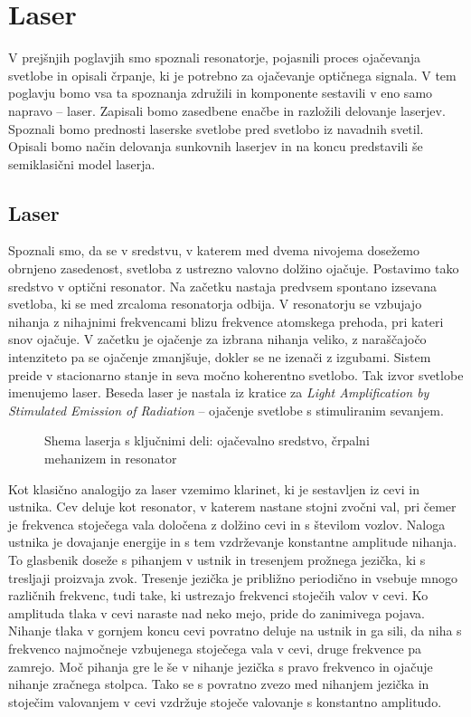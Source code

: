 \chapter{Laser}

V prejšnjih poglavjih smo spoznali resonatorje, pojasnili proces ojačevanja svetlobe in 
opisali črpanje, ki je potrebno za ojačevanje optičnega signala. V tem poglavju bomo vsa ta
spoznanja združili in komponente sestavili v eno samo napravo -- laser. Zapisali
bomo zasedbene enačbe in razložili delovanje laserjev. Spoznali bomo prednosti 
laserske svetlobe pred svetlobo iz navadnih svetil. Opisali bomo način delovanja 
sunkovnih laserjev in na koncu predstavili še semiklasični model laserja. 

\section{Laser}
Spoznali smo, da se v sredstvu, v katerem med dvema nivojema dosežemo obrnjeno 
zasedenost, svetloba z ustrezno valovno dolžino ojačuje. 
Postavimo tako sredstvo v optični resonator.  
Na začetku nastaja predvsem spontano izsevana svetloba, ki 
 se med zrcaloma resonatorja odbija.
V resonatorju se vzbujajo nihanja z nihajnimi frekvencami blizu frekvence
atomskega prehoda, pri kateri snov ojačuje. V začetku je ojačenje za
izbrana nihanja veliko, z naraščajočo intenziteto pa se ojačenje zmanjšuje, 
dokler se ne izenači z izgubami. 
Sistem preide v stacionarno stanje in seva močno koherentno svetlobo. Tak
izvor svetlobe imenujemo laser. Beseda laser je nastala iz kratice za {\it Light
Amplification by Stimulated Emission of Radiation} --  ojačenje svetlobe s
stimuliranim sevanjem.

\begin{figure}[h]
\centering
\def\svgwidth{100truemm} 

\caption{Shema laserja s ključnimi deli: ojačevalno sredstvo, črpalni mehanizem in resonator}
\label{fig:shemalaserja}
\end{figure}
\begin{remark}
Kot klasično analogijo za laser vzemimo klarinet, ki je sestavljen iz 
cevi in ustnika. Cev deluje kot resonator, v katerem nastane 
stojni zvočni val, pri čemer je frekvenca stoječega vala določena z 
dolžino cevi in s številom vozlov. Naloga ustnika je dovajanje energije 
in s tem vzdrževanje konstantne amplitude nihanja. To glasbenik doseže s 
pihanjem v ustnik in tresenjem prožnega jezička, ki s tresljaji proizvaja 
zvok. Tresenje jezička je približno periodično in vsebuje mnogo različnih 
frekvenc, tudi take, ki ustrezajo frekvenci stoječih valov v cevi. 
Ko amplituda tlaka v cevi naraste nad neko mejo, pride do zanimivega
pojava. Nihanje tlaka v gornjem koncu cevi povratno deluje na ustnik
in ga sili, da niha s frekvenco najmočneje vzbujenega stoječega vala v cevi,
druge frekvence pa zamrejo. Moč pihanja gre le še v
nihanje jezička s pravo frekvenco in ojačuje nihanje zračnega stolpca. 
Tako se s povratno zvezo med nihanjem jezička in stoječim valovanjem v cevi
vzdržuje stoječe valovanje s konstantno amplitudo. 
\end{remark}

